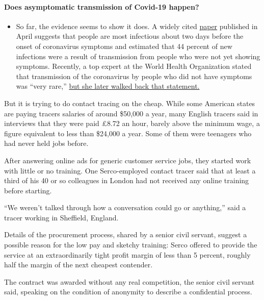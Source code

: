 \begin{itemize}
{  \paragraph{Does asymptomatic transmission of Covid-19
  happen?}\label{does-asymptomatic-transmission-of-covid-19-happen}}

  \begin{itemize}
  \tightlist
  \item
    So far, the evidence seems to show it does. A widely cited
    \href{https://www.nature.com/articles/s41591-020-0869-5}{paper}
    published in April suggests that people are most infectious about
    two days before the onset of coronavirus symptoms and estimated that
    44 percent of new infections were a result of transmission from
    people who were not yet showing symptoms. Recently, a top expert at
    the World Health Organization stated that transmission of the
    coronavirus by people who did not have symptoms was ``very rare,''
    \href{https://www.nytimes.com/2020/06/09/world/coronavirus-updates.html?action=click\&pgtype=Article\&state=default\&region=MAIN_CONTENT_3\&context=storylines_faq\#link-1f302e21}{but
    she later walked back that statement.}
  \end{itemize}
\end{itemize}

But it is trying to do contact tracing on the cheap. While some American
states are paying tracers salaries of around \$50,000 a year, many
English tracers said in interviews that they were paid £8.72 an hour,
barely above the minimum wage, a figure equivalent to less than \$24,000
a year. Some of them were teenagers who had never held jobs before.

After answering online ads for generic customer service jobs, they
started work with little or no training. One Serco-employed contact
tracer said that at least a third of his 40 or so colleagues in London
had not received any online training before starting.

``We weren't talked through how a conversation could go or anything,''
said a tracer working in Sheffield, England.

Details of the procurement process, shared by a senior civil servant,
suggest a possible reason for the low pay and sketchy training: Serco
offered to provide the service at an extraordinarily tight profit margin
of less than 5 percent, roughly half the margin of the next cheapest
contender.

The contract was awarded without any real competition, the senior civil
servant said, speaking on the condition of anonymity to describe a
confidential process.

